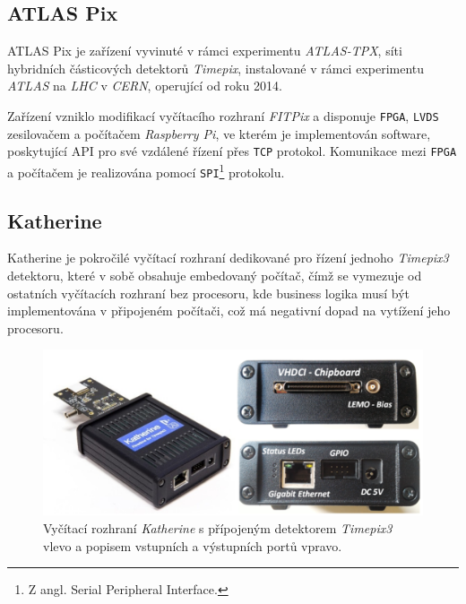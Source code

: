 \subsection{ATLAS Pix}\label{chap:detectors:readouts:atlaspix}
ATLAS Pix \cite{atlastpx_sw, BegeraBcThesis2016} je zařízení vyvinuté v rámci experimentu \textit{ATLAS-TPX}, síti hybridních částicových detektorů \textit{Timepix}, instalované v rámci experimentu \textit{ATLAS} na \textit{LHC} v \textit{CERN}, operující od roku 2014.

Zařízení vzniklo modifikací vyčítacího rozhraní \textit{FITPix} a disponuje \texttt{FPGA}, \texttt{LVDS} zesilovačem a počítačem \textit{Raspberry Pi}, ve kterém je implementován software, poskytující API pro své vzdálené řízení přes \texttt{TCP} protokol. Komunikace mezi \texttt{FPGA} a počítačem je realizována pomocí \texttt{SPI}\footnote{Z angl. Serial Peripheral Interface.} protokolu.

\subsection{Katherine}\label{chap:detectors:readouts:katherine}

Katherine \cite{Katherine} je pokročilé vyčítací rozhraní dedikované pro řízení jednoho \textit{Timepix3} detektoru, které v sobě obsahuje embedovaný počítač, čímž se vymezuje od ostatních vyčítacích rozhraní bez procesoru, kde business logika musí být implementována v připojeném počítači, což má negativní dopad na vytížení jeho procesoru. 

\begin{figure}[h]
	\begin{center}
		\includegraphics[width=15cm]{figures/det_katherine.png}
		\caption{Vyčítací rozhraní \textit{Katherine} s přípojeným detektorem \textit{Timepix3} vlevo a popisem vstupních a výstupních portů vpravo\cite{Katherine}.}
		\label{fig:det:readout:katherine}
	\end{center}
\end{figure}

